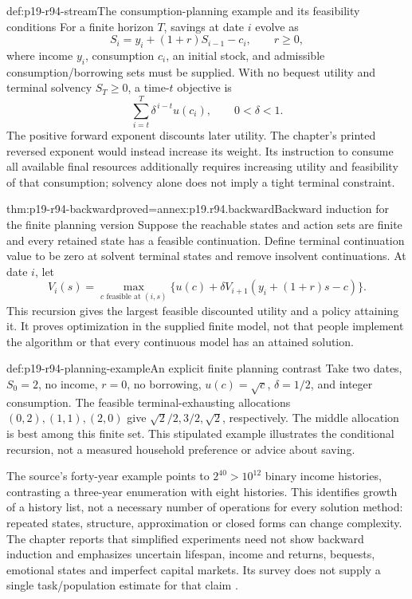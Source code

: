 \begin{hbdefinition}{def:p19-r94-stream}{The consumption-planning example and its feasibility conditions}
For a finite horizon \(T\), savings at date \(i\) evolve as
\[
        S_i=y_i+(1+r)S_{i-1}-c_i,\qquad r\geq0,
\]
where income \(y_i\), consumption \(c_i\), an initial stock, and
admissible consumption/borrowing sets must be supplied. With no bequest
utility and terminal solvency \(S_T\geq0\), a time-\(t\) objective is
\[
             \sum_{i=t}^T\delta^{\,i-t}u(c_i),\qquad 0<\delta<1.
\]
The positive forward exponent discounts later utility. The chapter's
printed reversed exponent would instead increase its weight.
Its instruction to consume all available final resources additionally
requires increasing utility and feasibility of that consumption; solvency
alone does not imply a tight terminal constraint.
\end{hbdefinition}

\begin{hbtheorem}{thm:p19-r94-backward}{proved=annex:p19.r94.backward}{Backward induction for the finite planning version}
Suppose the reachable states and action sets are finite and every retained
state has a feasible continuation. Define terminal continuation value to
be zero at solvent terminal states and remove insolvent continuations.
At date \(i\), let
\[
 V_i(s)=\max_{c\text{ feasible at }(i,s)}
        \{u(c)+\delta V_{i+1}(y_i+(1+r)s-c)\}.
\]
This recursion gives the largest feasible discounted utility and a policy
attaining it. It proves optimization in the supplied finite model, not
that people implement the algorithm or that every continuous model has
an attained solution.
\end{hbtheorem}

\begin{hbexample}{def:p19-r94-planning-example}{An explicit finite planning contrast}
Take two dates, \(S_0=2\), no income, \(r=0\), no borrowing,
\(u(c)=\sqrt c\), \(\delta=1/2\), and integer consumption. The
feasible terminal-exhausting allocations \((0,2),(1,1),(2,0)\)
give \(\sqrt2/2,3/2,\sqrt2\), respectively. The middle allocation
is best among this finite set. This stipulated example illustrates the
conditional recursion, not a measured household preference or advice
about saving.
\end{hbexample}

The source's forty-year example points to \(2^{40}>10^{12}\) binary
income histories, contrasting a three-year enumeration with eight
histories. This identifies growth of a history list, not a necessary
number of operations for every solution method: repeated states,
structure, approximation or closed forms can change complexity.
The chapter reports that simplified experiments need not show backward
induction and emphasizes uncertain lifespan, income and returns,
bequests, emotional states and imperfect capital markets. Its survey
does not supply a single task/population estimate for that claim
\cite[pp.~568--569]{DhamiAlNowaihi2021Economics}.

